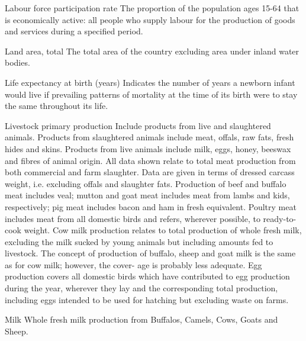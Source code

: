\begin{MetadataCollection} {}
\begin{metadata}{Labour force participation rate} {}
The proportion of the population ages 15-64 that is economically active: all people who supply labour for the production of goods and services during a specified period.
\end{metadata}

\begin{metadata}{Land area, total} {}
The total area of the country excluding area under inland water bodies.
\end{metadata}

\begin{metadata}{Life expectancy at birth (years)} {}
Indicates the number of years a newborn infant would live if prevailing patterns of mortality at the time of its birth were to stay the same throughout its life.
\end{metadata}

\begin{metadata}{Livestock primary production} {}
Include products from live and slaughtered animals. Products from slaughtered animals include meat, offals, raw fats, fresh hides and skins.  Products from live animals include milk, eggs, honey, beeswax and fibres of animal origin. All data shown relate to total meat production from both commercial and farm slaughter. Data are given in terms of dressed carcass weight, i.e. excluding offals and slaughter fats. Production of beef and buffalo meat includes veal; mutton and goat meat includes meat from lambs and kids, respectively; pig meat includes bacon and ham in fresh equivalent. Poultry meat includes meat from all domestic birds and refers, wherever possible, to ready-to-cook weight. Cow milk production relates to total production of whole fresh milk, excluding the milk sucked by young animals but including amounts fed to livestock. The concept of production of buffalo, sheep and goat milk is the same as for cow milk; however, the cover- age is probably less adequate. Egg production covers all domestic birds which have contributed to egg production during the year, wherever they lay and the corresponding total production, including eggs intended to be used for hatching but excluding waste on farms.
\end{metadata}

\begin{metadata}{Milk} {}
Whole fresh milk production from Buffalos, Camels, Cows, Goats and Sheep.
\end{metadata}


\end{MetadataCollection}
